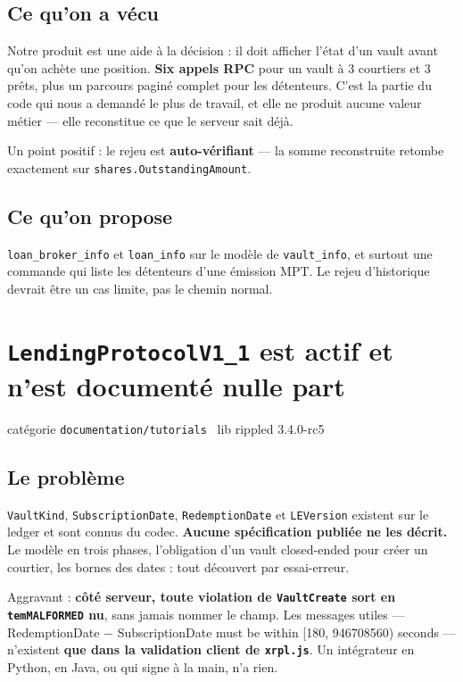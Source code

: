 \documentclass[10pt,a4paper]{article}
\newcommand{\cat}[2]{{\small\textsf{catégorie} \texttt{#1} \textperiodcentered\ \textsf{lib} #2}\par\vspace{2pt}}
\newcommand{\tc}[1]{\texttt{#1}}
\begin{document}
\subsection{Ce qu'on a vécu}
Notre produit est une aide à la décision : il doit afficher l'état d'un vault avant qu'on
achète une position. \textbf{Six appels RPC} pour un vault à 3 courtiers et 3 prêts, plus un
parcours paginé complet pour les détenteurs. C'est la partie du code qui nous a demandé le plus
de travail, et elle ne produit aucune valeur métier --- elle reconstitue ce que le serveur sait
déjà.

Un point positif : le rejeu est \textbf{auto-vérifiant} --- la somme reconstruite retombe
exactement sur \tc{shares.OutstandingAmount}.

\subsection{Ce qu'on propose}
\tc{loan\_broker\_info} et \tc{loan\_info} sur le modèle de \tc{vault\_info}, et surtout une
commande qui liste les détenteurs d'une émission MPT. Le rejeu d'historique devrait être un cas
limite, pas le chemin normal.

\section{\texttt{LendingProtocolV1\_1} est actif et n'est documenté nulle part}
\cat{documentation/tutorials}{rippled 3.4.0-rc5}

\subsection{Le problème}
\tc{VaultKind}, \tc{SubscriptionDate}, \tc{RedemptionDate} et \tc{LEVersion} existent sur le
ledger et sont connus du codec. \textbf{Aucune spécification publiée ne les décrit.} Le modèle
en trois phases, l'obligation d'un vault closed-ended pour créer un courtier, les bornes des
dates : tout découvert par essai-erreur.

Aggravant : \textbf{côté serveur, toute violation de \tc{VaultCreate} sort en \tc{temMALFORMED}
nu}, sans jamais nommer le champ. Les messages utiles --- \og RedemptionDate $-$ SubscriptionDate
must be within [180, 946708560) seconds\fg{} --- n'existent \textbf{que dans la validation client de
\tc{xrpl.js}}. Un intégrateur en Python, en Java, ou qui signe à la main, n'a rien.
\end{document}
